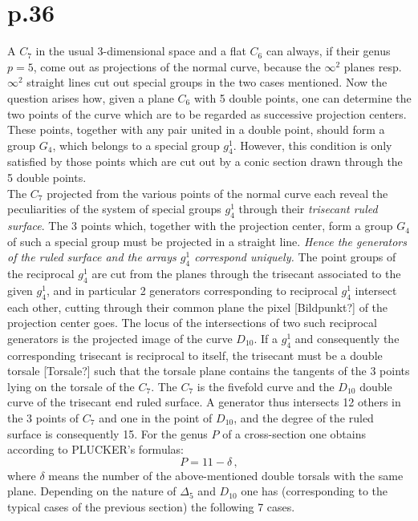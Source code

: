\documentclass[leqno]{article}
\begin{document}
\section{p.36}
A $C_7$ in the usual 3-dimensional space and a flat $C_6$ can always, if their genus $p=5$, come out as projections of the normal curve, because the $\infty^2$ planes resp. $\infty^2$ straight lines cut out special groups in the two cases mentioned. Now the question arises how, given a plane $C_6$ with 5 double points, one can determine the two points of the curve which are to be regarded as successive projection centers. These points, together with any pair united in a double point, should form a group $G_4$, which belongs to a special group $g_4^1$. However, this condition is only satisfied by those points which are cut out by a conic section drawn through the 5 double points. \\
The $C_7$ projected from the various points of the normal curve each reveal the peculiarities of the system of special groups $g_4^1$ through their \textit{trisecant ruled surface}. The 3 points which, together with the projection center, form a group $G_4$ of such a special group must be projected in a straight line. \textit{Hence the generators of the ruled surface and the arrays $g_4^1$ correspond uniquely.} The point groups of the reciprocal $g_4^1$ are cut from the planes through the trisecant associated to the given $g_4^1$, and in particular 2 generators corresponding to reciprocal $g_4^1$ intersect each other, cutting through their common plane the pixel [Bildpunkt?] of the projection center goes. The locus of the intersections of two such reciprocal generators is the projected image of the curve $D_{10}$. If a $g_4^1$ and consequently the corresponding trisecant is reciprocal to itself, the trisecant must be a double torsale [Torsale?] such that the torsale plane contains the tangents of the 3 points lying on the torsale of the $C_7$.
The $C_7$ is the fivefold curve and the $D_{10}$ double curve of the trisecant end ruled surface. A generator thus intersects 12 others in the 3 points of $C_7$ and one in the point of $D_{10}$, and the degree of the ruled surface is consequently 15. For the genus $P$ of a cross-section one obtains according to PLUCKER's formulas: 
\[
P=11-\delta \, , 
\]
where $\delta$ means the number of the above-mentioned double torsals with the same plane. Depending on the nature of $\Delta_5$ and $D_{10}$ one has (corresponding to the typical cases of the previous section) the following 7 cases.
\end{document}
